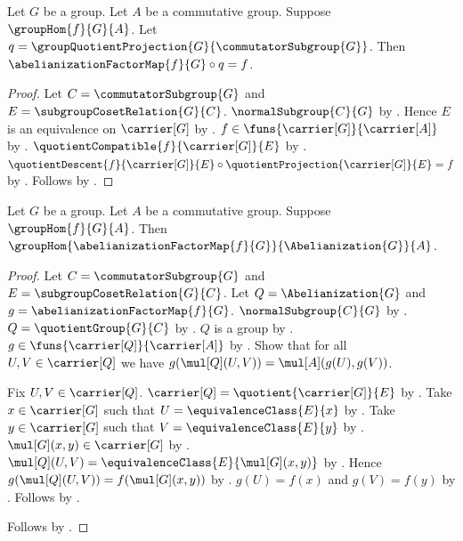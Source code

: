\begin{theorem}\label{abelianization_factorization}
    Let $G$ be a group.
    Let $A$ be a commutative group.
    Suppose $\groupHom{f}{G}{A}$.
    Let $q=\groupQuotientProjection{G}{\commutatorSubgroup{G}}$.
    Then $\abelianizationFactorMap{f}{G}\circ q=f$.
\end{theorem}
\begin{proof}
    Let $C=\commutatorSubgroup{G}$ and
        $E=\subgroupCosetRelation{G}{C}$.
    $\normalSubgroup{C}{G}$ by .
    Hence $E$ is an equivalence on $\carrier[G]$ by
        .
    $f\in\funs{\carrier[G]}{\carrier[A]}$ by
        .
    $\quotientCompatible{f}{\carrier[G]}{E}$ by
        .
    $\quotientDescent{f}{\carrier[G]}{E}\circ
        \quotientProjection{\carrier[G]}{E}=f$ by
        .
    Follows by
        .
\end{proof}

\begin{theorem}\label{abelianization_factor_hom}
    Let $G$ be a group.
    Let $A$ be a commutative group.
    Suppose $\groupHom{f}{G}{A}$.
    Then
        $\groupHom
            {\abelianizationFactorMap{f}{G}}{\Abelianization{G}}{A}$.
\end{theorem}
\begin{proof}
    Let $C=\commutatorSubgroup{G}$ and
        $E=\subgroupCosetRelation{G}{C}$.
    Let $Q=\Abelianization{G}$ and
        $g=\abelianizationFactorMap{f}{G}$.
    $\normalSubgroup{C}{G}$ by .
    $Q=\quotientGroup{G}{C}$ by .
    $Q$ is a group by
        .
    $g\in\funs{\carrier[Q]}{\carrier[A]}$ by
        .
    Show that for all $U,V\in\carrier[Q]$ we have
        $g(\mul[Q](U,V))=\mul[A](g(U),g(V))$.
    \begin{subproof}
        Fix $U,V\in\carrier[Q]$.
        $\carrier[Q]=\quotient{\carrier[G]}{E}$ by
            .
        Take $x\in\carrier[G]$ such that
            $U=\equivalenceClass{E}{x}$ by .
        Take $y\in\carrier[G]$ such that
            $V=\equivalenceClass{E}{y}$ by .
        $\mul[G](x,y)\in\carrier[G]$ by
            .
        $\mul[Q](U,V)=
            \equivalenceClass{E}{\mul[G](x,y)}$ by
            .
        Hence $g(\mul[Q](U,V))=f(\mul[G](x,y))$ by
            .
        $g(U)=f(x)$ and $g(V)=f(y)$ by
            .
        Follows by .
    \end{subproof}
    Follows by .
\end{proof}


